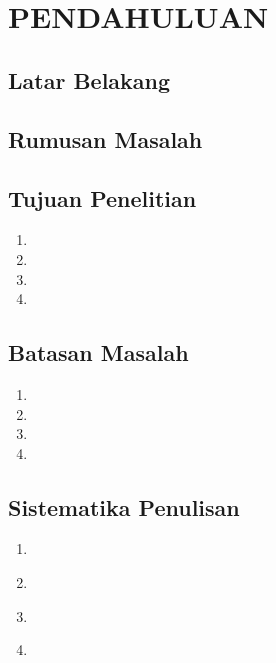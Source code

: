 \chapter[PENDAHULUAN]{\\ PENDAHULUAN}

\section{Latar Belakang}
\lipsum[2]

\section{Rumusan Masalah}
\lipsum[2]

\section{Tujuan Penelitian}
\lipsum[2]

\begin{enumerate}
    \item \lipsum[2][5]
    \item \lipsum[2][5]
    \item \lipsum[2][5]
    \item \lipsum[2][5]
\end{enumerate}

\section{Batasan Masalah}
\lipsum[2]

\begin{enumerate}
    \item \lipsum[2][5]
    \item \lipsum[2][5]
    \item \lipsum[2][5]
    \item \lipsum[2][5]
\end{enumerate}

\section{Sistematika Penulisan}
\lipsum[2]

\begin{enumerate}
    \item \lipsum[2][5] \\ \lipsum[2]
    \item \lipsum[2][5] \\ \lipsum[2]
    \item \lipsum[2][5] \\ \lipsum[2]
    \item \lipsum[2][5] \\ \lipsum[2]
\end{enumerate}